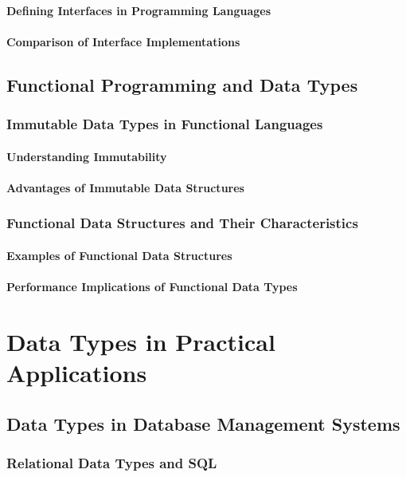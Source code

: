 \documentclass[12pt, oneside]{book}
\begin{document}
\subsubsection{Defining Interfaces in Programming Languages}
\subsubsection{Comparison of Interface Implementations}
\section{Functional Programming and Data Types}
\subsection{Immutable Data Types in Functional Languages}
\subsubsection{Understanding Immutability}
\subsubsection{Advantages of Immutable Data Structures}
\subsection{Functional Data Structures and Their Characteristics}
\subsubsection{Examples of Functional Data Structures}
\subsubsection{Performance Implications of Functional Data Types}

\chapter{Data Types in Practical Applications}
\section{Data Types in Database Management Systems}
\subsection{Relational Data Types and SQL}
\end{document}
